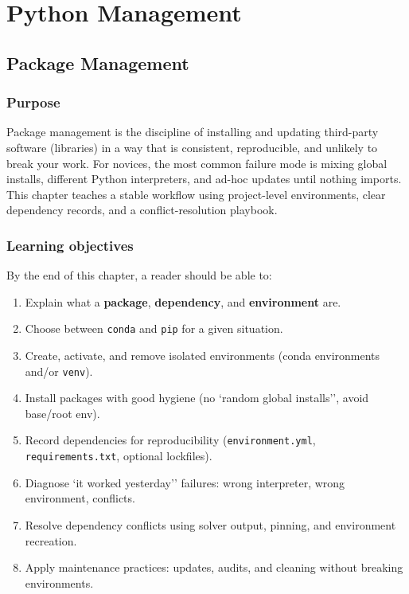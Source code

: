 \part{Python Management}

\chapter{Package Management}
\label{ch:pkg-mgmt}

\section*{Purpose}
Package management is the discipline of installing and updating third-party software (libraries) in a way that is consistent, reproducible, and unlikely to break your work. For novices, the most common failure mode is mixing global installs, different Python interpreters, and ad-hoc updates until nothing imports. This chapter teaches a stable workflow using project-level environments, clear dependency records, and a conflict-resolution playbook.

\section*{Learning objectives}
By the end of this chapter, a reader should be able to:
\begin{enumerate}
\item Explain what a \textbf{package}, \textbf{dependency}, and \textbf{environment} are.
\item Choose between \texttt{conda} and \texttt{pip} for a given situation.
\item Create, activate, and remove isolated environments (conda environments and/or \texttt{venv}).
\item Install packages with good hygiene (no `random global installs'', avoid base/root env).
  \item Record dependencies for reproducibility (\texttt{environment.yml}, \texttt{requirements.txt}, optional lockfiles).
  \item Diagnose `it worked yesterday'' failures: wrong interpreter, wrong environment, conflicts.
\item Resolve dependency conflicts using solver output, pinning, and environment recreation.
\item Apply maintenance practices: updates, audits, and cleaning without breaking environments.
\end{enumerate}

